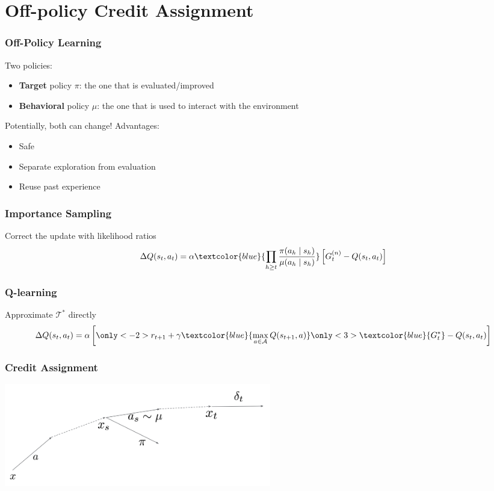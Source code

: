 \documentclass{beamer}
\begin{document}

\section{Off-policy Credit Assignment}
\frame{\tableofcontents[currentsection]}

\begin{frame}
\frametitle{Off-Policy Learning}
Two policies:
\begin{itemize}
\item \textbf{Target} policy $\pi$: the one that is evaluated/improved
\item \textbf{Behavioral} policy $\mu$: the one that is 
used to interact with the environment
\end{itemize}
Potentially, both can change!
\vfill
Advantages: 
\begin{itemize}
\item Safe
\item Separate exploration from evaluation
\item Reuse past experience
\end{itemize}
\end{frame}

\begin{frame}
\frametitle{Importance Sampling}
Correct the update with likelihood ratios
\[
	\Delta Q(s_t,a_t) = \alpha
	\textcolor{blue}{\prod_{h\geq t}\frac{\pi(a_h\mid s_h)}{\mu(a_h\mid s_h)}}
	\left[G_t^{(n)} - Q(s_t,a_t)\right]
\]
\vfill
{}
\end{frame}

\begin{frame}
\frametitle{Q-learning}
Approximate $\mathcal{T}^*$ directly
\[
	\Delta Q(s_t,a_t) = \alpha
	\left[ 
	\only<-2>{
	r_{t+1} +\gamma\textcolor{blue}{\max_{a\in\mathcal{A}}Q(s_{t+1},a)}
	}\only<3>{\textcolor{blue}{G_t^*}}
	 - Q(s_t,a_t)\right]
\]
\end{frame}

\begin{frame}
\frametitle{Credit Assignment}
\centering
\centerline{\includegraphics[height=4.5cm]{images/off_credit}}
\end{frame}
\end{document}
